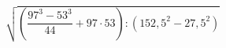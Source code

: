 \begin{ex}[type=calculate]
	\begin{condition}
		\( \sqrt{\left( \dfrac{97^3-53^3}{44}+97\cdot53 \right):(152,5^2-27,5^2)} \)
	\end{condition}
\end{ex}